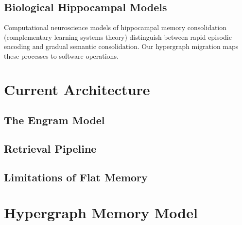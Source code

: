 \documentclass[man,12pt,floatsintext]{apa7}
\begin{document}
\subsection{Biological Hippocampal Models}

Computational neuroscience models of hippocampal memory consolidation (complementary
learning systems theory) distinguish between rapid episodic encoding and gradual semantic
consolidation. Our hypergraph migration maps these processes to software operations.

\section{Current Architecture}

\subsection{The Engram Model}


\subsection{Retrieval Pipeline}


\subsection{Limitations of Flat Memory}


\section{Hypergraph Memory Model}
\end{document}
